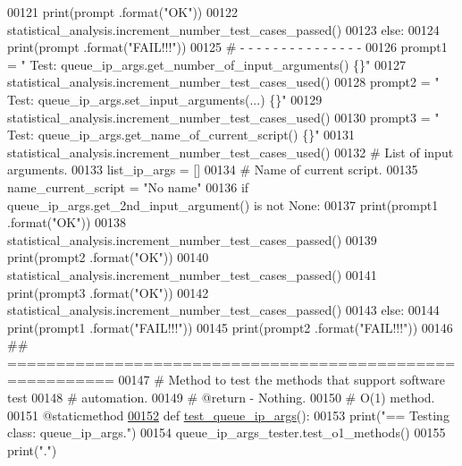 \begin{DoxyCode}
00121             print(prompt .format(\textcolor{stringliteral}{"OK"}))
00122             statistical\_analysis.increment\_number\_test\_cases\_passed()
00123         \textcolor{keywordflow}{else}:
00124             print(prompt .format(\textcolor{stringliteral}{"FAIL!!!"}))
00125         \textcolor{comment}{#   -   -   -   -   -   -   -   -   -   -   -   -   -   -   -}
00126         prompt1 = \textcolor{stringliteral}{" Test: queue\_ip\_args.get\_number\_of\_input\_arguments() \{\}"}
00127         statistical\_analysis.increment\_number\_test\_cases\_used()
00128         prompt2 = \textcolor{stringliteral}{" Test: queue\_ip\_args.set\_input\_arguments(...)        \{\}"}
00129         statistical\_analysis.increment\_number\_test\_cases\_used()
00130         prompt3 = \textcolor{stringliteral}{" Test: queue\_ip\_args.get\_name\_of\_current\_script()    \{\}"}
00131         statistical\_analysis.increment\_number\_test\_cases\_used()
00132         \textcolor{comment}{#   List of input arguments.}
00133         list\_ip\_args = []
00134         \textcolor{comment}{#   Name of current script.}
00135         name\_current\_script = \textcolor{stringliteral}{"No name"}
00136         \textcolor{keywordflow}{if} queue\_ip\_args.get\_2nd\_input\_argument() \textcolor{keywordflow}{is} \textcolor{keywordflow}{not} \textcolor{keywordtype}{None}:
00137             print(prompt1 .format(\textcolor{stringliteral}{"OK"}))
00138             statistical\_analysis.increment\_number\_test\_cases\_passed()
00139             print(prompt2 .format(\textcolor{stringliteral}{"OK"}))
00140             statistical\_analysis.increment\_number\_test\_cases\_passed()
00141             print(prompt3 .format(\textcolor{stringliteral}{"OK"}))
00142             statistical\_analysis.increment\_number\_test\_cases\_passed()
00143         \textcolor{keywordflow}{else}:
00144             print(prompt1 .format(\textcolor{stringliteral}{"FAIL!!!"}))
00145             print(prompt2 .format(\textcolor{stringliteral}{"FAIL!!!"}))
00146     \textcolor{comment}{## =========================================================}
00147     \textcolor{comment}{#   Method to test the methods that support software test}
00148     \textcolor{comment}{#       automation.}
00149     \textcolor{comment}{#   @return - Nothing.}
00150     \textcolor{comment}{#   O(1) method.}
00151     @staticmethod
\hypertarget{queue__ip__arguments__tester_8py_source_l00152}{}\hyperlink{classutilities_1_1queue__ip__arguments__tester_1_1queue__ip__args__tester_aee90077323d94238d7f81b23e31207c3}{00152}     \textcolor{keyword}{def }\hyperlink{classutilities_1_1queue__ip__arguments__tester_1_1queue__ip__args__tester_aee90077323d94238d7f81b23e31207c3}{test\_queue\_ip\_args}():
00153         print(\textcolor{stringliteral}{"==   Testing class: queue\_ip\_args."})
00154         queue\_ip\_args\_tester.test\_o1\_methods()
00155         print(\textcolor{stringliteral}{"."})
\end{DoxyCode}
